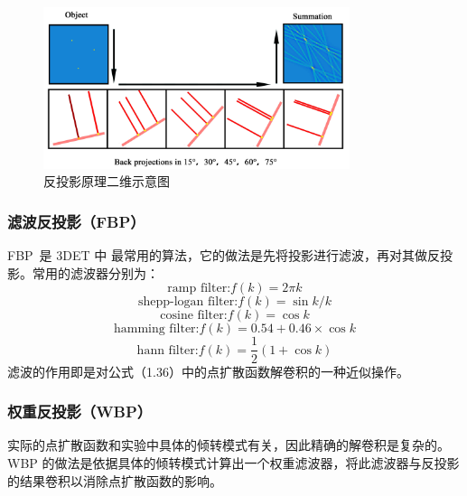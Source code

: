 \begin{figure}[htbp]
	\vspace{\baselineskip}
	\centering
	\includegraphics[width=0.8\textwidth]{../1.7/17}
	\caption{反投影原理二维示意图}\label{fig:17}
\end{figure}

\subsubsection{滤波反投影（FBP）}
FBP~\cite{Kak1988}是 3DET 中 最常用的算法，它的做法是先将投影进行滤波，再对其做反投影。常用的滤波器分别为：
\begin{equation}
\text{ramp filter:} f(k)=2\pi k
\end{equation}
\begin{equation}
\text{shepp-logan filter:} f(k)=\sin  k / k
\end{equation}
\begin{equation}
\text{cosine filter:} f(k)=\cos k
\end{equation}
\begin{equation}
\text{hamming filter:} f(k)=0.54+0.46\times \cos k
\end{equation}
\begin{equation}
\text{hann filter:} f(k)= \frac{1}{2} \left(1+\cos k\right)
\end{equation}
滤波的作用即是对公式（1.36）中的点扩散函数解卷积的一种近似操作。
\subsubsection{权重反投影（WBP）}
实际的点扩散函数和实验中具体的倾转模式有关，因此精确的解卷积是复杂的。WBP 的做法是依据具体的倾转模式计算出一个权重滤波器，将此滤波器与反投影的结果卷积以消除点扩散函数的影响。

